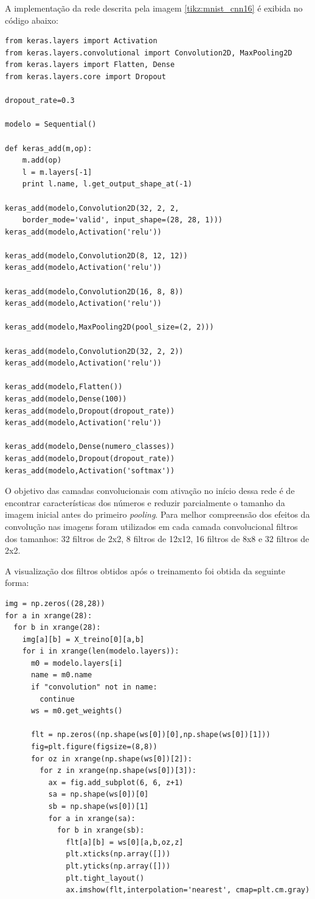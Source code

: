 \documentclass[
	12pt,				%
	oneside,			%
	a4paper,			%
	english,			%
	french,				%
	spanish,			%
	brazil,				%
	]{abntex2}
\begin{document}
\par A implementação da rede descrita pela imagem \ref{tikz:mnist_cnn16} é exibida no código abaixo:
\begin{lstlisting}
from keras.layers import Activation
from keras.layers.convolutional import Convolution2D, MaxPooling2D
from keras.layers import Flatten, Dense
from keras.layers.core import Dropout

dropout_rate=0.3

modelo = Sequential()

def keras_add(m,op):
	m.add(op)
	l = m.layers[-1]
	print l.name, l.get_output_shape_at(-1)

keras_add(modelo,Convolution2D(32, 2, 2,
	border_mode='valid', input_shape=(28, 28, 1)))
keras_add(modelo,Activation('relu'))

keras_add(modelo,Convolution2D(8, 12, 12))
keras_add(modelo,Activation('relu'))

keras_add(modelo,Convolution2D(16, 8, 8))
keras_add(modelo,Activation('relu'))

keras_add(modelo,MaxPooling2D(pool_size=(2, 2)))

keras_add(modelo,Convolution2D(32, 2, 2))
keras_add(modelo,Activation('relu'))

keras_add(modelo,Flatten())
keras_add(modelo,Dense(100))
keras_add(modelo,Dropout(dropout_rate))
keras_add(modelo,Activation('relu'))

keras_add(modelo,Dense(numero_classes))
keras_add(modelo,Dropout(dropout_rate))
keras_add(modelo,Activation('softmax'))
\end{lstlisting}

\par O objetivo das camadas convolucionais com ativação no início dessa rede é de encontrar características dos números e reduzir parcialmente o tamanho da imagem inicial antes do primeiro \textit{pooling}. Para melhor compreensão dos efeitos da convolução nas imagens foram utilizados em cada camada convolucional filtros dos tamanhos: 32 filtros de 2x2, 8 filtros de 12x12, 16 filtros de 8x8 e 32 filtros de 2x2.

\par A visualização dos filtros obtidos após o treinamento foi obtida da seguinte forma:
\begin{lstlisting}
img = np.zeros((28,28))
for a in xrange(28):
  for b in xrange(28):
    img[a][b] = X_treino[0][a,b]
    for i in xrange(len(modelo.layers)):
      m0 = modelo.layers[i]
      name = m0.name
      if "convolution" not in name:
        continue    
      ws = m0.get_weights()

      flt = np.zeros((np.shape(ws[0])[0],np.shape(ws[0])[1]))
      fig=plt.figure(figsize=(8,8))
      for oz in xrange(np.shape(ws[0])[2]):
        for z in xrange(np.shape(ws[0])[3]):
          ax = fig.add_subplot(6, 6, z+1)
          sa = np.shape(ws[0])[0]
          sb = np.shape(ws[0])[1]
          for a in xrange(sa):
            for b in xrange(sb):
              flt[a][b] = ws[0][a,b,oz,z]
              plt.xticks(np.array([]))
              plt.yticks(np.array([]))
              plt.tight_layout()        
              ax.imshow(flt,interpolation='nearest', cmap=plt.cm.gray) 
\end{lstlisting}
\end{document}
